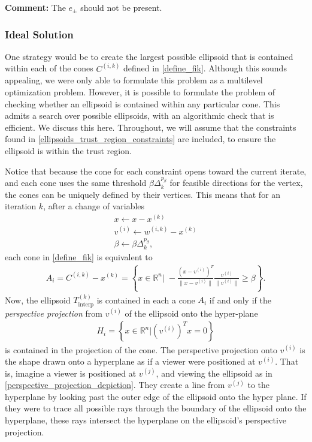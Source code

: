 \documentclass{article}
\newenvironment{comment}
  {\par\medskip
   \color{red}%
   \begin{framed}
   \textbf{Comment: }\ignorespaces}
 {\end{framed}
  \medskip}
\theoremstyle{case}
\numberwithin{theorem}{subsection}
\newcommand{\ck}{{c^{(k)}}}
\newcommand{\dk}{\Delta_k}
\newcommand{\qk}{{Q^{(k)}}}
\newcommand{\Rn}{\mathbb R^n}
\newcommand{\sampletrk}{{T_{\text{interp}}^{(k)}}}
\newcommand{\sk}{{{s}^{(k)}}}
\newcommand{\wik}{{w^{(i, k)}}}
\newcommand{\xk}{x^{(k)}}
\newcommand{\fik}{{C^{(i, k)}}}
\begin{document}
\begin{comment}
The $e_{\pm}$ should not be present.
\end{comment}


\subsubsection{Ideal Solution}
\label{ideal_ellipsoid_in_polyhedron}

One strategy would be to create the largest possible ellipsoid that is contained within each of the cones $\fik$ defined in \cref{define_fik}.
Although this sounds appealing, we were only able to formulate this problem as a multilevel optimization problem.
However, it is possible to formulate the problem of checking whether an ellipsoid is contained within any particular cone.
This admits a search over possible ellipsoids, with an algorithmic check that is efficient.
We discuss this here.
Throughout, we will assume that the constraints found in \cref{ellipsoids_trust_region_constraints} are included, to ensure the ellipsoid is within the trust region.

Notice that because the cone for each constraint opens toward the current iterate,
and each cone uses the same threshold $\beta \dk^{p_\beta}$ for feasible directions for the vertex,
the cones can be uniquely defined by their vertices.
This means that for an iteration $k$, after a change of variables
\begin{align}
x \gets x - \xk \\
v^{(i)}  \gets \wik - \xk \\
\beta \gets \beta \dk^{p_{\beta}},
\end{align}
each cone in \cref{define_fik} is equivalent to
\begin{align*}
A_i = \fik - \xk = \left\{x\in\Rn\bigg|\;-\frac{(x - v^{(i)})^T}{\|x - v^{(i)}\|} \frac{v^{(i)}}{\|v^{(i)}\|} \ge \beta \right\}.
\end{align*}
Now, the ellipsoid $\sampletrk$ is contained in each a cone $A_i$ if and only if the \emph{perspective projection} from $v^{(i)}$ of the ellipsoid onto the hyper-plane 
\begin{align*}
H_i = \left\{x \in \Rn \bigg|\left(v^{(i)}\right)^Tx = 0\right\}
\end{align*}
is contained in the projection of the cone.
The perspective projection onto $v^{(i)}$ is the shape drawn onto a hyperplane as if a viewer were positioned at $v^{(i)}$.
That is, imagine a viewer is positioned at $v^{(j)}$, and viewing the ellipsoid as in \cref{perspective_projection_depiction}.
They create a line from $v^{(j)}$ to the hyperplane by looking past the outer edge of the ellipsoid onto the hyper plane.
If they were to trace all possible rays through the boundary of the ellipsoid onto the hyperplane, 
these rays intersect the hyperplane on the ellipsoid's perspective projection.
\end{document}
